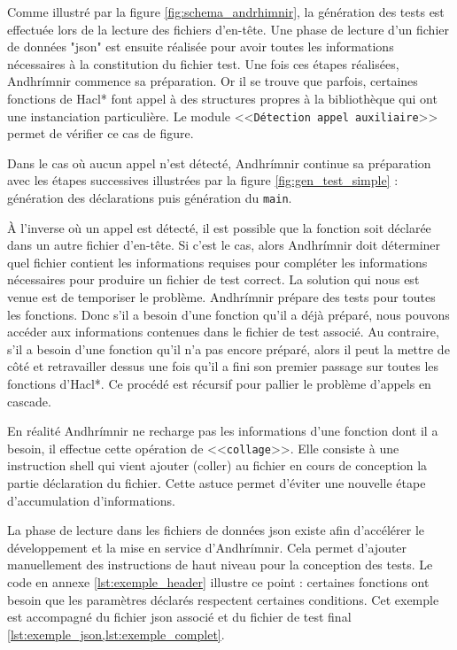 Comme illustré par la figure \ref{fig:schema_andrhimnir}, la génération des tests est effectuée lors de la lecture des fichiers d'en-tête. Une phase de lecture d'un fichier de données "json" est ensuite réalisée pour avoir toutes les informations nécessaires à la constitution du fichier test. Une fois ces étapes réalisées, Andhrímnir commence sa préparation. Or il se trouve que parfois, certaines fonctions de Hacl* font appel à des structures propres à la bibliothèque qui ont une instanciation particulière. Le module <<\texttt{Détection appel auxiliaire}>> permet de vérifier ce cas de figure.\smallbreak

Dans le cas où aucun appel n'est détecté, Andhrímnir continue sa préparation avec les étapes successives illustrées par la figure \ref{fig:gen_test_simple} : génération des déclarations puis génération du \texttt{main}.\smallbreak

À l'inverse où un appel est détecté, il est possible que la fonction soit déclarée dans un autre fichier d'en-tête. Si c'est le cas, alors Andhrímnir doit déterminer quel fichier contient les informations requises pour compléter les informations nécessaires pour produire un fichier de test correct. La solution qui nous est venue est de temporiser le problème. Andhrímnir prépare des tests pour toutes les fonctions. Donc s'il a besoin d'une fonction qu'il a déjà préparé, nous pouvons accéder aux informations contenues dans le fichier de test associé. Au contraire, s'il a besoin d'une fonction qu'il n'a pas encore préparé, alors il peut la mettre de côté et retravailler dessus une fois qu'il a fini son premier passage sur toutes les fonctions d'Hacl*. Ce procédé est récursif pour pallier le problème d'appels en cascade.\smallbreak

En réalité Andhrímnir ne recharge pas les informations d'une fonction dont il a besoin, il effectue cette opération de <<\texttt{collage}>>. Elle consiste à une instruction shell qui vient ajouter (coller) au fichier en cours de conception la partie déclaration du fichier. Cette astuce permet d'éviter une nouvelle étape d'accumulation d'informations.\medbreak

La phase de lecture dans les fichiers de données json existe afin d'accélérer le développement et la mise en service d'Andhrímnir. Cela permet d'ajouter manuellement des instructions de haut niveau pour la conception des tests. Le code en annexe \ref{lst:exemple_header} illustre ce point : certaines fonctions ont besoin que les paramètres déclarés respectent certaines conditions. Cet exemple est accompagné du fichier json associé et du fichier de test final \ref{lst:exemple_json,lst:exemple_complet}.  


